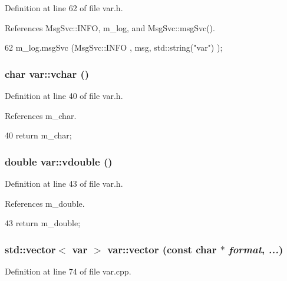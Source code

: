 Definition at line 62 of file var.h.

References MsgSvc::INFO, m\_\-log, and MsgSvc::msgSvc().


\begin{DoxyCode}
62 { m_log.msgSvc (MsgSvc::INFO    , msg, std::string("var") ); }
\end{DoxyCode}
\hypertarget{classvar_af5c2865eb834ce2d22991a3250d278ba}{
\subsubsection[{vchar}]{\setlength{\rightskip}{0pt plus 5cm}char var::vchar ()}}
\label{classvar_af5c2865eb834ce2d22991a3250d278ba}


Definition at line 40 of file var.h.

References m\_\-char.


\begin{DoxyCode}
40 { return m_char; } 
\end{DoxyCode}
\hypertarget{classvar_aabcdbcace1882ed0c6506deabf4eddcb}{
\subsubsection[{vdouble}]{\setlength{\rightskip}{0pt plus 5cm}double var::vdouble ()}}
\label{classvar_aabcdbcace1882ed0c6506deabf4eddcb}


Definition at line 43 of file var.h.

References m\_\-double.


\begin{DoxyCode}
43 { return m_double; }
\end{DoxyCode}
\hypertarget{classvar_a1fe5529702a2697eb8cf69e8f80b0d86}{
\subsubsection[{vector}]{\setlength{\rightskip}{0pt plus 5cm}std::vector$<$ {\bf var} $>$ var::vector (const char $\ast$ {\em format}, \/   {\em ...})}}
\label{classvar_a1fe5529702a2697eb8cf69e8f80b0d86}


Definition at line 74 of file var.cpp.


